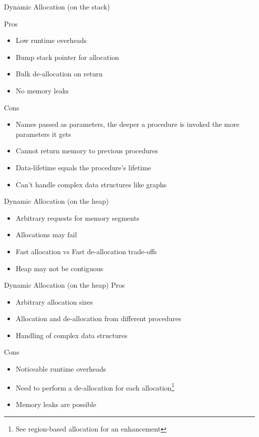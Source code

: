 \documentclass[
14pt,
aspectratio=169,
usenames,
dvipsnames,
x11names]{beamer}
\newcommand{\tik}[0]{{\color{YellowGreen}\Checkmark}} %
\newcommand{\ex}[0]{{\color{BrickRed}\XSolidBrush}}  %
\begin{document}
\begin{frame}{Dynamic Allocation (on the stack)}

  Pros \tik
  \begin{itemize}  \setlength{\itemsep}{\fill}
  \item \alert{Low runtime overheads}
  \item \alert{Bump stack pointer} for allocation
  \item \alert{Bulk} de-allocation on return
  \item No \alert{memory leaks}
  \end{itemize}

  \pause

  Cons \ex
  \begin{itemize}  \setlength{\itemsep}{\fill}
  \item Names passed as parameters, the deeper a procedure is invoked \alert{the more parameters it gets}
  \item \alert{Cannot return memory} to previous procedures
  \item Data-lifetime \alert{equals} the procedure's lifetime
  \item Can't handle \alert{complex data structures} like graphs
  \end{itemize}

\end{frame}

\begin{frame}{Dynamic Allocation (on the heap)}
  \begin{itemize}  \setlength{\itemsep}{\fill}
  \item \alert{Arbitrary requests} for memory segments
  \item Allocations \alert{may fail}
  \item Fast allocation vs Fast de-allocation \alert{trade-offs}
  \item Heap may \alert{not be contiguous}
  \end{itemize}
\end{frame}

\begin{frame}{Dynamic Allocation (on the heap)}
  Pros \tik
  \begin{itemize}  \setlength{\itemsep}{\fill}
  \item \alert{Arbitrary} allocation sizes
  \item Allocation and de-allocation \alert{from different procedures}
  \item Handling of \alert{complex data structures}
  \end{itemize}

  \pause

  Cons \ex
  \begin{itemize}  \setlength{\itemsep}{\fill}
  \item Noticeable \alert{runtime overheads}
  \item Need to perform \alert{a de-allocation for each allocation}\footnote{See region-based allocation for an enhancement}
  \item \alert{Memory leaks} are possible
  \end{itemize}
\end{frame}
\end{document}
